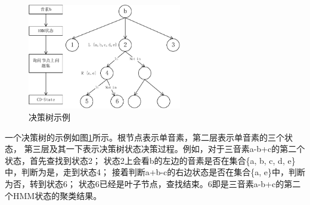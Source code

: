\begin{figure}
\centering
\includegraphics[width=0.6\textwidth]{figures/chapter4/tree-crop}
\caption{决策树示例}
\label{fig:tree}
\end{figure}

一个决策树的示例如图\ref{fig:tree}所示。根节点表示单音素，第二层表示单音素的三个状态，
第三层及其一下表示决策树状态决策过程。例如，对于三音素a-b+c的第二个状态，首先查找到状态2；
状态2上会看b的左边的音素是否在集合\{a, b, c, d, e\}中，判断为是，走到状态4；
接着判断a+b-c的右边状态是否在集合\{a, e\}中，判断为否，转到状态6；
状态6已经是叶子节点，查找结束。6即是三音素a-b+c的第二个HMM状态的聚类结果。

